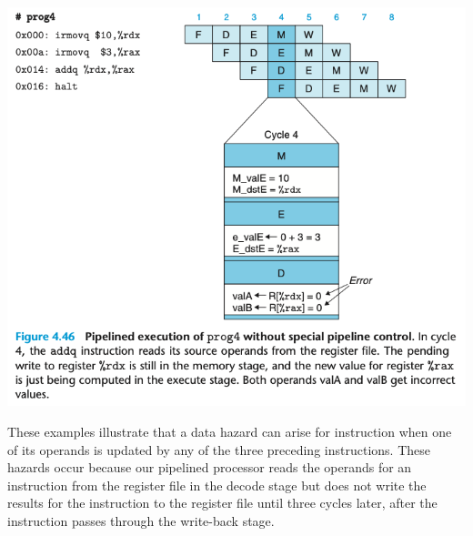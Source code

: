 \documentclass[11pt]{article}
\begin{document}
\begin{center}
\includegraphics[width=.9\linewidth]{pics/figure4.46.png}
\end{center}

These examples illustrate that a data hazard can arise for instruction when one of its operands is updated by any of the three preceding instructions. These hazards occur because our pipelined processor reads the operands for an instruction from the register file in the decode stage but does not write the results for the instruction to the register file until three cycles later, after the instruction passes through the write-back stage.\\
\end{document}
